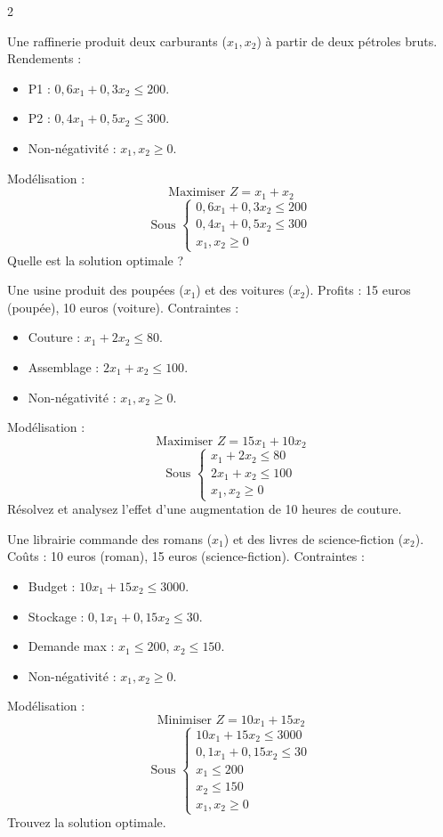 \begin{multicols}{2}
\begin{exo}
	Une raffinerie produit deux carburants (\(x_1, x_2\)) à partir de deux pétroles bruts. Rendements :
	\begin{itemize}
		\item P1 : \(0,6x_1 + 0,3x_2 \leq 200\).
		\item P2 : \(0,4x_1 + 0,5x_2 \leq 300\).
		\item Non-négativité : \(x_1, x_2 \geq 0\).
	\end{itemize}
	Modélisation :
	\[
	\text{Maximiser } Z = x_1 + x_2
	\]
	\[
	\text{Sous } \begin{cases}
	0,6x_1 + 0,3x_2 \leq 200 \\
	0,4x_1 + 0,5x_2 \leq 300 \\
	x_1, x_2 \geq 0
	\end{cases}
	\]
	Quelle est la solution optimale ?
\end{exo}

\begin{exo}
	Une usine produit des poupées (\(x_1\)) et des voitures (\(x_2\)). Profits : 15 euros (poupée), 10 euros (voiture). Contraintes :
	\begin{itemize}
		\item Couture : \(x_1 + 2x_2 \leq 80\).
		\item Assemblage : \(2x_1 + x_2 \leq 100\).
		\item Non-négativité : \(x_1, x_2 \geq 0\).
	\end{itemize}
	Modélisation :
	\[
	\text{Maximiser } Z = 15x_1 + 10x_2
	\]
	\[
	\text{Sous } \begin{cases}
	x_1 + 2x_2 \leq 80 \\
	2x_1 + x_2 \leq 100 \\
	x_1, x_2 \geq 0
	\end{cases}
	\]
	Résolvez et analysez l'effet d'une augmentation de 10 heures de couture.
\end{exo}

\begin{exo}
	Une librairie commande des romans (\(x_1\)) et des livres de science-fiction (\(x_2\)). Coûts : 10 euros (roman), 15 euros (science-fiction). Contraintes :
	\begin{itemize}
		\item Budget : \(10x_1 + 15x_2 \leq 3000\).
		\item Stockage : \(0,1x_1 + 0,15x_2 \leq 30\).
		\item Demande max : \(x_1 \leq 200\), \(x_2 \leq 150\).
		\item Non-négativité : \(x_1, x_2 \geq 0\).
	\end{itemize}
	Modélisation :
	\[
	\text{Minimiser } Z = 10x_1 + 15x_2
	\]
	\[
	\text{Sous } \begin{cases}
	10x_1 + 15x_2 \leq 3000 \\
	0,1x_1 + 0,15x_2 \leq 30 \\
	x_1 \leq 200 \\
	x_2 \leq 150 \\
	x_1, x_2 \geq 0
	\end{cases}
	\]
	Trouvez la solution optimale.
\end{exo}


\end{multicols}
